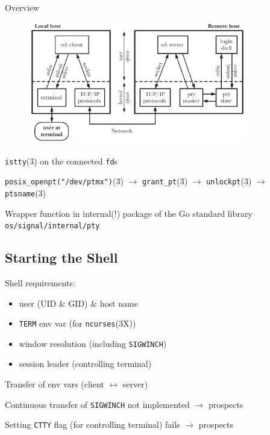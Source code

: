 \documentclass[
	xcolor=dvipsnames,
	handout
]{beamer}
\newenvironment{zhawframe}[1][]
{\begin{frame}[environment=fr,#1]{\insertsubsectionhead}{\insertsectionhead}}
{\end{frame}
}
\begin{document}
\begin{zhawframe}
Overview
\begin{figure}[ht]
\includegraphics[width=0.85\textwidth]{PseudoterminalSSH}
\end{figure}
\end{zhawframe}

\begin{zhawframe}
 \texttt{istty}(3) on the connected \texttt{fd}s

 \texttt{posix\_{}openpt("/dev/ptmx")}(3) $\rightarrow$ \texttt{grant\_{}pt}(3) $\rightarrow$ \texttt{unlockpt}(3) $\rightarrow$ \texttt{ptsname}(3)

 Wrapper function in internal(!) package of the Go standard library \texttt{os/signal/internal/pty}
\end{zhawframe}

\subsection{Starting the Shell}
\begin{zhawframe}
 Shell requirements:

	\begin{itemize}
	\item user (UID \& GID) \& host name
	\item \texttt{TERM} env var (for \texttt{ncurses}(3X))
	\item window resolution (including \texttt{SIGWINCH})
	\item session leader (controlling terminal)
	\end{itemize}
	
 Transfer of env vars (client $\leftrightarrow$ server)

 Continuous transfer of \texttt{SIGWINCH} not implemented $\rightarrow$ prospects

 Setting \texttt{CTTY} flag (for controlling terminal) fails $\rightarrow$ prospects
\end{zhawframe}
\end{document}
